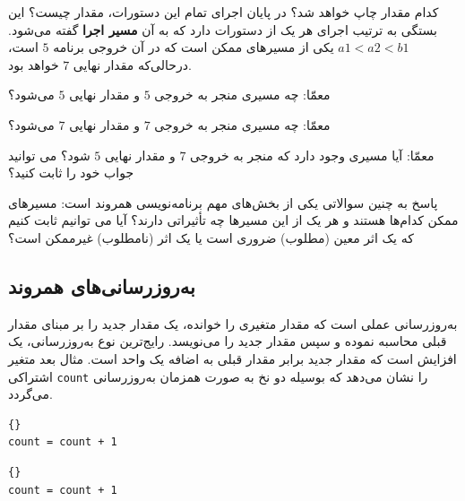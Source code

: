 \documentclass{book}
\begin{document}
کدام مقدار  چاپ خواهد شد؟ در پایان اجرای تمام این دستورات، مقدار  چیست؟ 
این بستگی به ترتیب اجرای هر یک از دستورات دارد که به آن \textbf{مسیر اجرا} گفته می‌شود. 
$a1 < a2 < b1$ یکی از مسیرهای ممکن است که در آن خروجی برنامه 
\texttt{$5$} است، درحالی‌که مقدار نهایی \texttt{$7$} خواهد بود. 


معمّا: چه مسیری منجر به خروجی \texttt{$5$} و مقدار نهایی \texttt{$5$} می‌شود؟

معمّا: چه مسیری منجر به خروجی \texttt{$7$} و مقدار نهایی \texttt{$7$} می‌شود؟

معمّا: آیا مسیری وجود دارد که منجر به خروجی \texttt{$7$} و مقدار نهایی \texttt{$5$} شود؟ می توانید جواب خود را ثابت کنید؟


    پاسخ به چنین سوالاتی یکی از بخش‌های مهم برنامه‌نویسی همروند است: مسیرهای ممکن کدام‌ها هستند و هر یک از این مسیرها چه تأثیراتی دارند؟ 
    آیا می توانیم ثابت کنیم که یک اثر معین (مطلوب) ضروری است یا یک اثر (نامطلوب) غیرممکن است؟


\subsection {به‌روزرسانی‌های همروند}

    به‌روزرسانی عملی است که مقدار متغیری را خوانده، یک مقدار جدید را بر مبنای مقدار قبلی محاسبه نموده و سپس مقدار جدید را می‌نویسد. 
    رایج‌ترین نوع به‌روزرسانی، یک افزایش  است که مقدار جدید برابر مقدار قبلی به اضافه یک واحد است. 
    مثال بعد متغیر اشتراکی \texttt{count} را نشان می‌دهد که بوسیله دو نخ به صورت همزمان به‌روزرسانی می‌گردد. 

\begin{latin}
\begin{minipage}[t]{2in}
\begin{latin}
\begin{lstlisting}[title=\rl{نخ \lr{A}}]{}
count = count + 1
\end{lstlisting}
\end{latin}
\end{minipage}
\hfill
\begin{minipage}[t]{2in}
\begin{latin}
\begin{lstlisting}[title=\rl{نخ \lr{B}}]{}
count = count + 1
\end{lstlisting}
\end{latin}
\end{minipage}
\end{latin}
\end{document}

